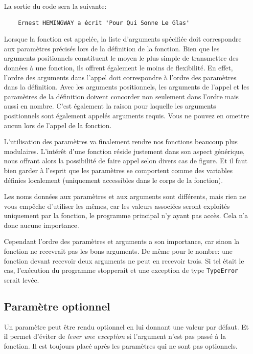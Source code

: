 \documentclass[a4paper,12pt]{book}
\begin{document}
La sortie du code sera la suivante:
\begin{verbatim}
    Ernest HEMINGWAY a écrit 'Pour Qui Sonne Le Glas'
\end{verbatim}
\medskip

Lorsque la fonction est appelée, la liste d'arguments spécifiée doit correspondre aux paramètres précisés lors de la définition de la fonction. Bien que les arguments positionnels constituent le moyen le plus simple de transmettre des données à une fonction, ils offrent également le moins de flexibilité. En effet, l'ordre des arguments dans l'appel doit correspondre à l'ordre des paramètres dans la définition. Avec les arguments positionnels, les arguments de l'appel et les paramètres de la définition doivent concorder non seulement dans l'ordre mais aussi en nombre. C'est également la raison pour laquelle les arguments positionnels sont également appelés arguments requis. Vous ne pouvez en omettre aucun lors de l'appel de la fonction.
\medskip

L'utilisation des paramètres va finalement rendre nos fonctions beaucoup plus modulaires. L'intérêt d'une fonction réside justement dans son aspect générique, nous offrant alors la possibilité de faire appel selon divers cas de figure. Et il faut bien garder à l'esprit que les paramètres se comportent comme des variables définies localement (uniquement accessibles dans le corps de la fonction).
\medskip

Les noms données aux paramètres et aux arguments sont différents, mais rien ne vous empêche d'utiliser les mêmes, car les valeurs associées seront exploités uniquement par la fonction, le programme principal n'y ayant pas accès. Cela n'a donc aucune importance.
\medskip

Cependant l'ordre des paramètres et arguments a son importance, car sinon la fonction ne recevrait pas les bons arguments. De même pour le nombre: une fonction devant recevoir deux arguments ne peut en recevoir trois. Si tel était le cas, l'exécution du programme stopperait et une exception de type \texttt{TypeError} serait levée. 
\medskip

\subsection*{Paramètre optionnel}
Un paramètre peut être rendu optionnel en lui donnant une valeur par défaut. Et il permet d'éviter de \textit{lever une exception} si l'argument n'est pas passé à la fonction. Il est toujours placé après les paramètres qui ne sont pas optionnels.
\medskip
\end{document}
